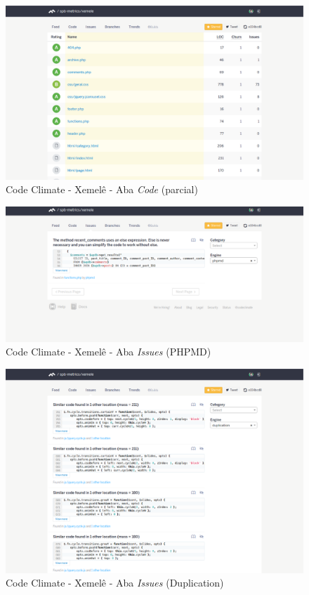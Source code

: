 \begin{figure}[!htb]
	\centering
    \includegraphics[keepaspectratio=true,scale=0.35]
    {figuras/codeclimate_code_tab.eps}
  \caption{Code Climate - Xemelê - Aba \textit{Code} (parcial)}
	\label{fig:codeclimate_code_tab}
\end{figure}

\newpage

\begin{figure}[!htb]
	\centering
    \includegraphics[keepaspectratio=true,scale=0.35]
    {figuras/codeclimate_issues_tab_phpmd.eps}
  \caption{Code Climate - Xemelê - Aba \textit{Issues} (PHPMD)}
	\label{fig:codeclimate_issues_tab_phpmd}
\end{figure}

\begin{figure}[!htb]
	\centering
    \includegraphics[keepaspectratio=true,scale=0.35]
    {figuras/codeclimate_issues_tab_duplication.eps}
  \caption{Code Climate - Xemelê - Aba \textit{Issues} (Duplication)}
	\label{fig:codeclimate_issues_tab_duplication}
\end{figure}

